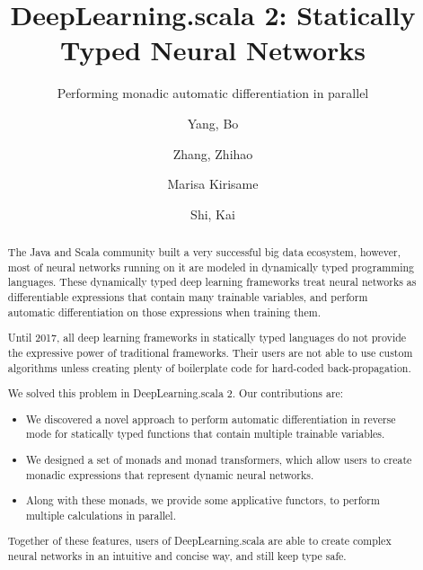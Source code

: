 \documentclass[acmsmall,10pt,review,screen]{acmart}
\begin{document}
\title{DeepLearning.scala 2: Statically Typed Neural Networks}
\subtitle{Performing monadic automatic differentiation in parallel}

\author{Yang, Bo}
\author{Zhang, Zhihao}
\author{Marisa Kirisame} 
\author{Shi, Kai} 

\begin{abstract}
The Java and Scala community built a very successful big data ecosystem, however, most of neural networks running on it are modeled in dynamically typed programming languages. These dynamically typed deep learning frameworks treat neural networks as differentiable expressions that contain many \glspl{trainable variable}, and perform automatic differentiation on those expressions when training them.

Until 2017, all deep learning frameworks in statically typed languages do not
provide the expressive power of traditional frameworks. Their users are not able to use custom algorithms unless creating plenty of boilerplate code for hard-coded back-propagation.

We solved this problem in DeepLearning.scala 2. Our contributions are:

\begin{itemize}
  \item We discovered a novel approach to perform automatic differentiation in reverse mode for statically typed functions that contain multiple \glspl{trainable variable}.
  \item We designed a set of monads and monad transformers, which allow users to create monadic expressions that represent dynamic neural networks.
  \item Along with these monads, we provide some applicative functors, to perform multiple calculations in parallel.
\end{itemize}

Together of these features, users of DeepLearning.scala are able to create complex neural networks in an intuitive and concise way, and still keep type safe.
\end{abstract}
\end{document}
